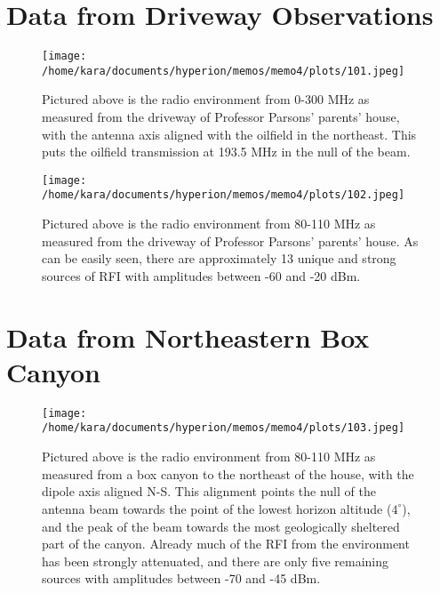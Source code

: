 \documentclass[11pt]{article}
\begin{document}
{}


\appendix

\section{Data from Driveway Observations}

\begin{figure}[H]
 \begin{center}
 \texttt{[image: /home/kara/documents/hyperion/memos/memo4/plots/101.jpeg]}
 \end{center}
 \caption{
        Pictured above is the radio environment from 0-300 MHz as measured from 
        the driveway of Professor Parsons' parents' house, with the antenna 
        axis aligned with the oilfield in the northeast. This puts the oilfield 
        transmission at 193.5 MHz in the null of the beam.
 }
 \label{fig:101}
\end{figure}

\begin{figure}[H]
 \begin{center}
 \texttt{[image: /home/kara/documents/hyperion/memos/memo4/plots/102.jpeg]}
 \end{center}
 \caption{
        Pictured above is the radio environment from 80-110 MHz as measured 
        from the driveway of Professor Parsons' parents' house. As can be 
        easily seen, there are approximately 13 unique and strong sources of 
        RFI with amplitudes between -60 and -20 dBm.
 }
 \label{fig:102}
\end{figure}

\section{Data from Northeastern Box Canyon}

\begin{figure}[H]
 \begin{center}
 \texttt{[image: /home/kara/documents/hyperion/memos/memo4/plots/103.jpeg]}
 \end{center}
 \caption{
        Pictured above is the radio environment from 80-110 MHz as measured 
        from a box canyon to the northeast of the house, with the dipole axis 
        aligned N-S. This alignment points the null of the antenna beam towards 
        the point of the lowest horizon altitude ($4^{\circ}$), and the peak of 
        the beam towards the most geologically sheltered part of the canyon.  
        Already much of the RFI from the environment has been strongly 
        attenuated, and there are only five remaining sources with amplitudes 
        between -70 and -45 dBm.
 }
 \label{fig:103}
\end{figure}
\end{document}
